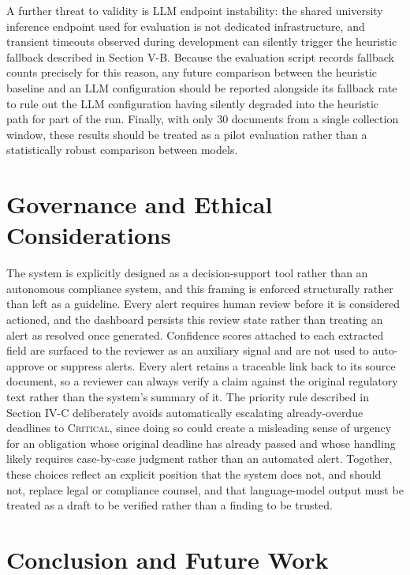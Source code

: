 \documentclass[conference]{IEEEtran}
\begin{document}
A further threat to validity is LLM endpoint instability: the shared university inference endpoint used for evaluation is not dedicated infrastructure, and transient timeouts observed during development can silently trigger the heuristic fallback described in Section V-B. Because the evaluation script records fallback counts precisely for this reason, any future comparison between the heuristic baseline and an LLM configuration should be reported alongside its fallback rate to rule out the LLM configuration having silently degraded into the heuristic path for part of the run. Finally, with only 30 documents from a single collection window, these results should be treated as a pilot evaluation rather than a statistically robust comparison between models.

\section{Governance and Ethical Considerations}

The system is explicitly designed as a decision-support tool rather than an autonomous compliance system, and this framing is enforced structurally rather than left as a guideline. Every alert requires human review before it is considered actioned, and the dashboard persists this review state rather than treating an alert as resolved once generated. Confidence scores attached to each extracted field are surfaced to the reviewer as an auxiliary signal and are not used to auto-approve or suppress alerts. Every alert retains a traceable link back to its source document, so a reviewer can always verify a claim against the original regulatory text rather than the system's summary of it. The priority rule described in Section IV-C deliberately avoids automatically escalating already-overdue deadlines to \textsc{Critical}, since doing so could create a misleading sense of urgency for an obligation whose original deadline has already passed and whose handling likely requires case-by-case judgment rather than an automated alert. Together, these choices reflect an explicit position that the system does not, and should not, replace legal or compliance counsel, and that language-model output must be treated as a draft to be verified rather than a finding to be trusted.

\section{Conclusion and Future Work}
\end{document}
